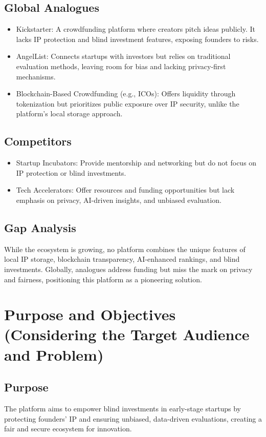\documentclass[12pt]{article}
\begin{document}
\subsection{Global Analogues}
\begin{itemize}
  \item Kickstarter: A crowdfunding platform where creators pitch ideas publicly. It lacks IP protection and blind investment features, exposing founders to risks.
  \item AngelList: Connects startups with investors but relies on traditional evaluation methods, leaving room for bias and lacking privacy-first mechanisms.
  \item Blockchain-Based Crowdfunding (e.g., ICOs): Offers liquidity through tokenization but prioritizes public exposure over IP security, unlike the platform's local storage approach.
\end{itemize}

\subsection{Competitors}
\begin{itemize}
  \item Startup Incubators: Provide mentorship and networking but do not focus on IP protection or blind investments.
  \item Tech Accelerators: Offer resources and funding opportunities but lack emphasis on privacy, AI-driven insights, and unbiased evaluation.
\end{itemize}

\subsection{Gap Analysis}
While the ecosystem is growing, no platform combines the unique features of local IP storage, blockchain transparency, AI-enhanced rankings, and blind investments. Globally, analogues address funding but miss the mark on privacy and fairness, positioning this platform as a pioneering solution.

\section{Purpose and Objectives (Considering the Target Audience and Problem)}

\subsection{Purpose}
The platform aims to empower blind investments in early-stage startups by protecting founders' IP and ensuring unbiased, data-driven evaluations, creating a fair and secure ecosystem for innovation.
\end{document}
